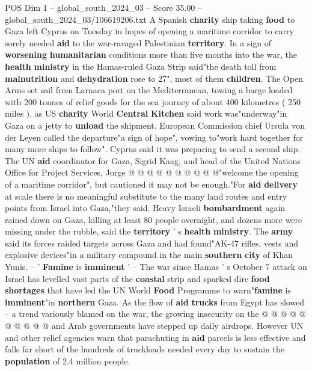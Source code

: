 \begin{textsample}{POS Dim 1 – global\_south\_2024\_03 – Score 35.00 – global\_south\_2024\_03/106619206.txt}  \label{ex:f1_pos_008}
A Spanish \textbf{charity} ship taking \textbf{food} to Gaza left Cyprus on Tuesday in hopes of opening a maritime corridor to carry sorely needed \textbf{aid} to the war-ravaged Palestinian \textbf{territory}.
In a sign of \textbf{worsening} \textbf{humanitarian} conditions more than five months into the war, the \textbf{health} \textbf{ministry} in the Hamas-ruled Gaza Strip said"the death toll from \textbf{malnutrition} and \textbf{dehydration} rose to 27", most of them \textbf{children}.
The Open Arms set sail from Larnaca port on the Mediterranean, towing a barge loaded with 200 tonnes of relief goods for the sea journey of about 400 kilometres ( 250 miles ), as US \textbf{charity} World \textbf{Central} \textbf{Kitchen} said work was"underway"in Gaza on a jetty to \textbf{unload} the shipment.
European Commission chief Ursula von der Leyen called the departure"a sign of hope", vowing to"work hard together for many more ships to follow".
Cyprus said it was preparing to send a second ship.
The UN \textbf{aid} coordinator for Gaza, Sigrid Kaag, and head of the United Nations Office for Project Services, Jorge @ @ @ @ @ @ @ @ @ @"welcome the opening of a maritime corridor", but cautioned it may not be enough."For \textbf{aid} \textbf{delivery} at scale there is no meaningful substitute to the many land routes and entry points from Israel into Gaza,"they said.
Heavy Israeli \textbf{bombardment} again rained down on Gaza, killing at least 80 people overnight, and dozens more were missing under the rubble, said the \textbf{territory} ' s \textbf{health} \textbf{ministry}.
The \textbf{army} said its forces raided targets across Gaza and had found"AK-47 rifles, vests and explosive devices"in a military compound in the main \textbf{southern} \textbf{city} of Khan Yunis. -- ' \textbf{Famine} is \textbf{imminent} ' -- The war since Hamas ' s October 7 attack on Israel has levelled vast parts of the \textbf{coastal} strip and sparked dire \textbf{food} \textbf{shortages} that have led the UN World \textbf{Food} Programme to warn"\textbf{famine} is \textbf{imminent}"in \textbf{northern} Gaza.
As the flow of \textbf{aid} \textbf{trucks} from Egypt has slowed -- a trend variously blamed on the war, the growing insecurity on the @ @ @ @ @ @ @ @ @ @ and Arab governments have stepped up daily airdrops.
However UN and other relief agencies warn that parachuting in \textbf{aid} parcels is less effective and falls far short of the hundreds of truckloads needed every day to sustain the \textbf{population} of 2.4 million people.

\end{textsample}
